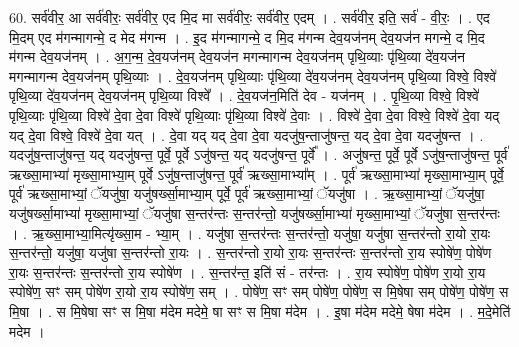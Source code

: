 \documentclass[17pt]{extarticle}
\begin{document}
60. सर्व॑वीर॒ आ सर्व॑वीरः॒ सर्व॑वीर॒ एद मि॒द मा सर्व॑वीरः॒ सर्व॑वीर॒ एदम् । . सर्व॑वीर॒ इति॒ सर्व॑ - वी॒रः॒ । . एद मि॒दम् एद म॑गन्मागन्मे॒ द मेद म॑गन्म । . इ॒द म॑गन्मागन्मे॒ द मि॒द म॑गन्म देव॒यज॑नम् देव॒यज॑न मगन्मे॒ द मि॒द म॑गन्म देव॒यज॑नम् । . अ॒ग॒न्म॒ दे॒व॒यज॑नम् देव॒यज॑न मगन्मागन्म देव॒यज॑नम् पृथि॒व्याः पृ॑थि॒व्या दे॑व॒यज॑न मगन्मागन्म देव॒यज॑नम् पृथि॒व्याः । . दे॒व॒यज॑नम् पृथि॒व्याः पृ॑थि॒व्या दे॑व॒यज॑नम् देव॒यज॑नम् पृथि॒व्या विश्वे॒ विश्वे॑ पृथि॒व्या दे॑व॒यज॑नम् देव॒यज॑नम् पृथि॒व्या विश्वे᳚ । . दे॒व॒यज॑न॒मिति॑ देव - यज॑नम् । . पृ॒थि॒व्या विश्वे॒ विश्वे॑ पृथि॒व्याः पृ॑थि॒व्या विश्वे॑ दे॒वा दे॒वा विश्वे॑ पृथि॒व्याः पृ॑थि॒व्या विश्वे॑ दे॒वाः । . विश्वे॑ दे॒वा दे॒वा विश्वे॒ विश्वे॑ दे॒वा यद् यद् दे॒वा विश्वे॒ विश्वे॑ दे॒वा यत् । . दे॒वा यद् यद् दे॒वा दे॒वा यदजु॑ष॒न्ताजु॑षन्त॒ यद् दे॒वा दे॒वा यदजु॑षन्त । . यदजु॑ष॒न्ताजु॑षन्त॒ यद् यदजु॑षन्त॒ पूर्वे॒ पूर्वे ऽजु॑षन्त॒ यद् यदजु॑षन्त॒ पूर्वे᳚ । . अजु॑षन्त॒ पूर्वे॒ पूर्वे ऽजु॑ष॒न्ताजु॑षन्त॒ पूर्व॑ ऋख्सा॒माभ्या॑ मृख्सा॒माभ्या॒म् पूर्वे ऽजु॑ष॒न्ताजु॑षन्त॒ पूर्व॑ ऋख्सा॒माभ्या᳚म् । . पूर्व॑ ऋख्सा॒माभ्या॑ मृख्सा॒माभ्या॒म् पूर्वे॒ पूर्व॑ ऋख्सा॒माभ्यां॒ ॅयजु॑षा॒ यजु॑षर्ख्सा॒माभ्या॒म् पूर्वे॒ पूर्व॑ ऋख्सा॒माभ्यां॒ ॅयजु॑षा । . ऋ॒ख्सा॒माभ्यां॒ ॅयजु॑षा॒ यजु॑षर्ख्सा॒माभ्या॑ मृख्सा॒माभ्यां॒ ॅयजु॑षा स॒न्तर॑न्तः स॒न्तर॑न्तो॒ यजु॑षर्ख्सा॒माभ्या॑ मृख्सा॒माभ्यां॒ ॅयजु॑षा स॒न्तर॑न्तः । . ऋ॒ख्सा॒माभ्या॒मित्यृ॑ख्सा॒म - भ्या॒म् । . यजु॑षा स॒न्तर॑न्तः स॒न्तर॑न्तो॒ यजु॑षा॒ यजु॑षा स॒न्तर॑न्तो रा॒यो रा॒यः स॒न्तर॑न्तो॒ यजु॑षा॒ यजु॑षा स॒न्तर॑न्तो रा॒यः । . स॒न्तर॑न्तो रा॒यो रा॒यः स॒न्तर॑न्तः स॒न्तर॑न्तो रा॒य स्पोषे॑ण॒ पोषे॑ण रा॒यः स॒न्तर॑न्तः स॒न्तर॑न्तो 
रा॒य स्पोषे॑ण । . स॒न्तर॑न्त॒ इति॑ सं - तर॑न्तः । . रा॒य स्पोषे॑ण॒ पोषे॑ण रा॒यो रा॒य स्पोषे॑ण॒ सꣳ सम् पोषे॑ण रा॒यो रा॒य स्पोषे॑ण॒ सम् । . पोषे॑ण॒ सꣳ सम् पोषे॑ण॒ पोषे॑ण॒ स मि॒षेषा सम् पोषे॑ण॒ पोषे॑ण॒ स मि॒षा । . स मि॒षेषा सꣳ स मि॒षा म॑देम मदेमे॒ षा सꣳ स मि॒षा म॑देम । . इ॒षा म॑देम मदेमे॒ षेषा म॑देम । . म॒दे॒मेति॑ मदेम । \newline
\pagebreak
{}
\end{document}
